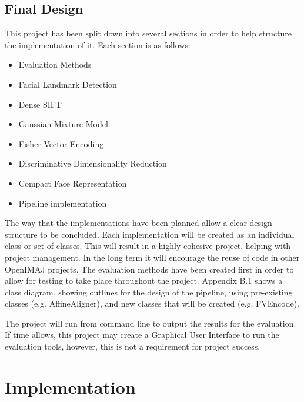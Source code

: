 \documentclass[12pt, a4paper]{article}
\begin{document}
\subsection{Final Design}
This project has been split down into several sections in order to help structure the implementation of it. Each section is as follows:
\begin{itemize}
\item Evaluation Methods
\item Facial Landmark Detection
\item Dense SIFT
\item Gaussian Mixture Model
\item Fisher Vector Encoding
\item Discriminative Dimensionality Reduction
\item Compact Face Representation
\item Pipeline implementation
\end{itemize}
The way that the implementations have been planned allow a clear design structure to be concluded. Each implementation will be created as an individual class or set of classes. This will result in a highly cohesive project, helping with project management. In the long term it will encourage the reuse of code in other OpenIMAJ projects. The evaluation methods have been created first in order to allow for testing to take place throughout the project. Appendix B.1 shows a class diagram, showing outlines for the design of the pipeline, using pre-existing classes (e.g. AffineAligner), and new classes that will be created (e.g. FVEncode).

The project will run from command line to output the results for the evaluation. If time allows, this project may create a Graphical User Interface to run the evaluation tools, however, this is not a requirement for project success.
\section{ Implementation}
\end{document}
